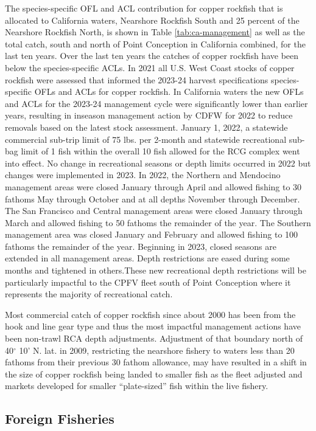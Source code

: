 \documentclass[11pt,
  english,
  letterpaper,
]{article}
\begin{document}
The species-specific OFL and ACL contribution for copper rockfish that is allocated to California waters, Nearshore Rockfish South and 25 percent of the Nearshore Rockfish North, is shown in Table \ref{tab:ca-management} as well as the total catch, south and north of Point Conception in California combined, for the last ten years. Over the last ten years the catches of copper rockfish have been below the species-specific ACLs. In 2021 all U.S. West Coast stocks of copper rockfish were assessed that informed the 2023-24 harvest specifications species-specific OFLs and ACLs for copper rockfish. In California waters the new OFLs and ACLs for the 2023-24 management cycle were significantly lower than earlier years, resulting in inseason management action by CDFW for 2022 to reduce removals based on the latest stock assessment. January 1, 2022, a statewide commercial sub-trip limit of 75 lbs. per 2-month and statewide recreational sub-bag limit of 1 fish within the overall 10 fish allowed for the RCG complex went into effect. No change in recreational seasons or depth limits occurred in 2022 but changes were implemented in 2023. In 2022, the Northern and Mendocino management areas were closed January through April and allowed fishing to 30 fathoms May through October and at all depths November through December. The San Francisco and Central management areas were closed January through March and allowed fishing to 50 fathoms the remainder of the year. The Southern management area was closed January and February and allowed fishing to 100 fathoms the remainder of the year. Beginning in 2023, closed seasons are extended in all management areas. Depth restrictions are eased during some months and tightened in others.These new recreational depth restrictions will be particularly impactful to the CPFV fleet south of Point Conception where it represents the majority of recreational catch.

Most commercial catch of copper rockfish since about 2000 has been from the hook and line gear type and thus the most impactful management actions have been non-trawl RCA depth adjustments. Adjustment of that boundary north of 40\(^\circ\) 10' N. lat. in 2009, restricting the nearshore fishery to waters less than 20 fathoms from their previous 30 fathom allowance, may have resulted in a shift in the size of copper rockfish being landed to smaller fish as the fleet adjusted and markets developed for smaller ``plate-sized'' fish within the live fishery.

\hypertarget{foreign-fisheries}{%
\subsection{Foreign Fisheries}\label{foreign-fisheries}}
\end{document}

